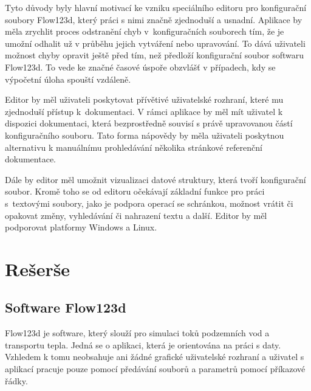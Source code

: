 \documentclass[FM,DP]{tulthesis}
\begin{document}
Tyto důvody byly hlavní motivací ke vzniku speciálního editoru pro konfigurační soubory Flow123d, který práci s nimi značně zjednoduší a usnadní. Aplikace by měla zrychlit proces odstranění chyb v~konfiguračních souborech tím, že je umožní odhalit už v průběhu jejich vytváření nebo upravování. To dává uživateli možnost chyby opravit ještě před tím, než předloží konfigurační soubor softwaru Flow123d. To vede ke značné časové úspoře obzvlášť v případech, kdy se výpočetní úloha spouští vzdáleně.

Editor by měl uživateli poskytovat přívětivé uživatelské rozhraní, které mu zjednoduší přístup k~dokumentaci. V rámci aplikace by měl mít uživatel k dispozici dokumentaci, která bezprostředně souvisí s právě upravovanou částí konfiguračního souboru. Tato forma nápovědy by měla uživateli poskytnou alternativu k manuálnímu prohledávání několika stránkové referenční dokumentace.

Dále by editor měl umožnit vizualizaci datové struktury, která tvoří konfigurační soubor. Kromě toho se od editoru očekávají základní funkce pro práci s~textovými soubory, jako je podpora operací se schránkou, možnost vrátit či opakovat změny, vyhledávání či nahrazení textu a další. Editor by měl podporovat platformy Windows a Linux.



\chapter{Rešerše}





\section{Software Flow123d}

Flow123d je software, který slouží pro simulaci toků podzemních vod a transportu tepla. Jedná se o aplikaci, která je orientována na práci s daty. Vzhledem k tomu neobsahuje ani žádné grafické uživatelské rozhraní a uživatel s aplikací pracuje pouze pomocí předávání souborů a parametrů pomocí příkazové řádky.
\end{document}
